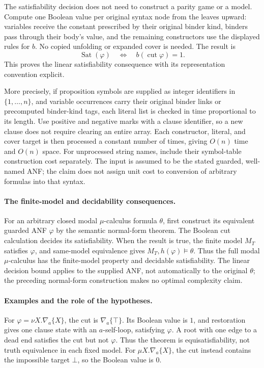 The satisfiability decision
does not need to construct
a parity game or a model.
Compute one Boolean value
per original syntax node
from the leaves upward:
variables receive the
constant prescribed by
their original binder kind,
binders pass through their
body's value, and the
remaining constructors use
the displayed rules for \(b\).
No copied unfolding or
expanded cover is needed.
The result is
\[
 \operatorname{Sat}(\varphi)
 \quad\Longleftrightarrow\quad
 b(\operatorname{cut}\varphi)=1.
\]
This proves the linear
satisfiability consequence
\cite[cor.~4.7]{JaninWalukiewicz1995}
with its representation
convention explicit.

More precisely, if proposition
symbols are supplied as integer
identifiers in \(\{1,\ldots,n\}\),
and variable occurrences carry
their original binder links
or precomputed binder-kind tags,
each literal list is checked
in time proportional to its
length. Use positive and
negative marks with a
clause identifier, so a
new clause does not require
clearing an entire array.
Each constructor, literal,
and cover target is then
processed a constant number
of times, giving \(O(n)\)
time and \(O(n)\) space.
For unprocessed string names,
include their symbol-table
construction cost separately.
The input is assumed to
be the stated guarded,
well-named ANF; the claim
does not assign unit cost
to conversion of arbitrary
formulas into that syntax.

\paragraph{The finite-model and decidability consequences.}
\label{sec:p09-mu-finite-model-decision}
For an arbitrary closed
modal \(\mu\)-calculus formula
\(\theta\), first construct
its equivalent guarded ANF
\(\varphi\) by the semantic
normal-form theorem.
The Boolean cut calculation
decides its satisfiability.
When the result is true,
the finite model \(M_T\)
satisfies \(\varphi\), and
same-model equivalence gives
\(M_T,h(\varphi)\models\theta\).
Thus the full modal
\(\mu\)-calculus has the
finite-model property and
decidable satisfiability.
The linear decision bound
applies to the supplied
ANF, not automatically
to the original \(\theta\);
the preceding normal-form
construction makes no
optimal complexity claim.

\paragraph{Examples and the role of the hypotheses.}
For
\(\varphi=\nu X.\nabla_a\{X\}\),
the cut is
\(\nabla_a\{\top\}\).
Its Boolean value is \(1\),
and restoration gives one
clause state with an
\(a\)-self-loop, satisfying
\(\varphi\).
A root with one edge
to a dead end satisfies
the cut but not \(\varphi\).
Thus the theorem is
equisatisfiability, not
truth equivalence in
each fixed model.
For \(\mu X.\nabla_a\{X\}\),
the cut instead contains
the impossible target
\(\bot\), so the Boolean
value is \(0\).

